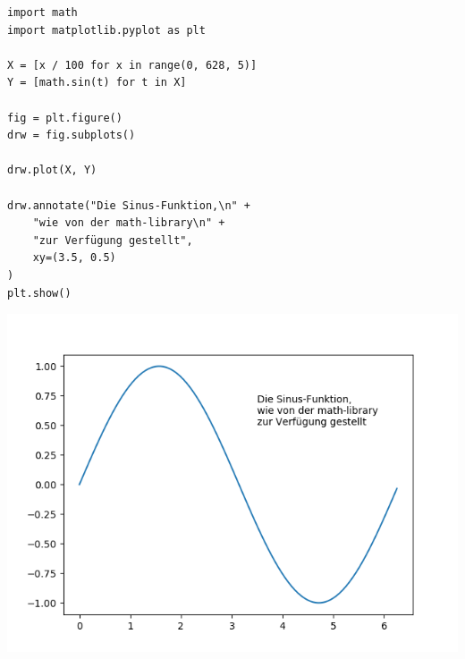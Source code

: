 
\begin{frame}[fragile]
%
\begin{tcbraster}[raster columns=2,
                  raster equal height,
                  nobeforeafter,
                  raster column skip=0.2cm]
\begin{codebox}
\begin{verbatim}
import math
import matplotlib.pyplot as plt

X = [x / 100 for x in range(0, 628, 5)]
Y = [math.sin(t) for t in X]

fig = plt.figure()
drw = fig.subplots()

drw.plot(X, Y)

drw.annotate("Die Sinus-Funktion,\n" +
    "wie von der math-library\n" +
    "zur Verfügung gestellt",
    xy=(3.5, 0.5)
)
plt.show()
\end{verbatim}
\end{codebox}
%
\begin{tcolorbox}[title=Output: Text Overlay]
	\includegraphics[width=\linewidth]{./gfx/plt-overlay-simple}
\end{tcolorbox}
\end{tcbraster}
%
\end{frame}


